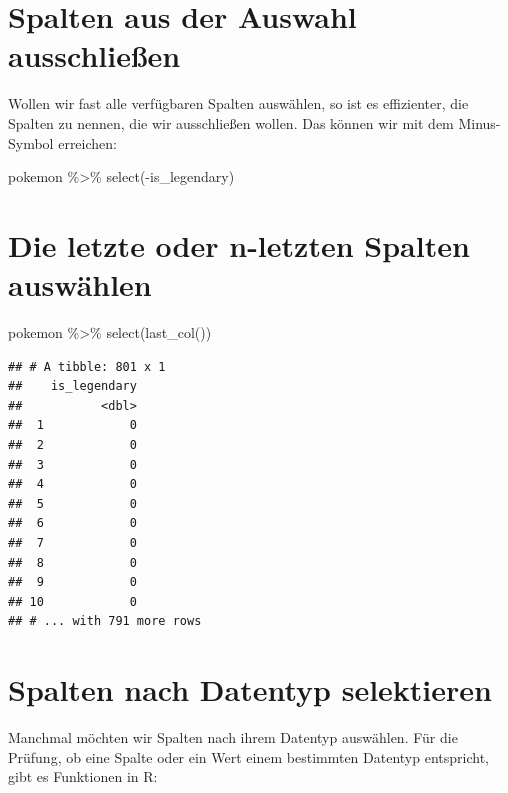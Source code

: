 \documentclass[
]{book}
\newenvironment{Shaded}{\begin{snugshade}}{\end{snugshade}}
\newcommand{\FunctionTok}[1]{\textcolor[rgb]{0.00,0.00,0.00}{#1}}
\newcommand{\NormalTok}[1]{#1}
\newcommand{\SpecialCharTok}[1]{\textcolor[rgb]{0.00,0.00,0.00}{#1}}
\begin{document}
\hypertarget{minus-operator}{%
\section{Spalten aus der Auswahl ausschließen}\label{minus-operator}}

Wollen wir fast alle verfügbaren Spalten auswählen, so ist es effizienter, die Spalten zu nennen, die wir ausschließen wollen. Das können wir mit dem Minus-Symbol erreichen:

\begin{Shaded}
\begin{Highlighting}[]
\NormalTok{pokemon }\SpecialCharTok{\%\textgreater{}\%}
  \FunctionTok{select}\NormalTok{(}\SpecialCharTok{{-}}\NormalTok{is\_legendary)}
\end{Highlighting}
\end{Shaded}

\hypertarget{die-letzte-oder-n-letzten-spalten-auswuxe4hlen}{%
\section{Die letzte oder n-letzten Spalten auswählen}\label{die-letzte-oder-n-letzten-spalten-auswuxe4hlen}}

\begin{Shaded}
\begin{Highlighting}[]
\NormalTok{pokemon }\SpecialCharTok{\%\textgreater{}\%}
  \FunctionTok{select}\NormalTok{(}\FunctionTok{last\_col}\NormalTok{())}
\end{Highlighting}
\end{Shaded}

\begin{verbatim}
## # A tibble: 801 x 1
##    is_legendary
##           <dbl>
##  1            0
##  2            0
##  3            0
##  4            0
##  5            0
##  6            0
##  7            0
##  8            0
##  9            0
## 10            0
## # ... with 791 more rows
\end{verbatim}

\hypertarget{spalten-nach-datentyp-selektieren}{%
\section{Spalten nach Datentyp selektieren}\label{spalten-nach-datentyp-selektieren}}

Manchmal möchten wir Spalten nach ihrem Datentyp auswählen. Für die Prüfung, ob eine Spalte oder ein Wert einem bestimmten Datentyp entspricht, gibt es Funktionen in R:
\end{document}
